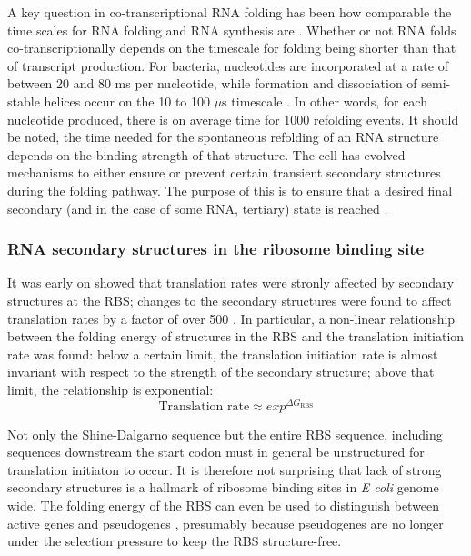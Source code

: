 A key question in co-transcriptional RNA folding has been how comparable the
time scales for RNA folding and RNA synthesis are
\cite{de_smit_translational_2003-1}. Whether or not RNA folds
co-transcriptionally depends on the timescale for folding being shorter than
that of transcript production. For bacteria, nucleotides are incorporated at a
rate of between 20 and 80 ms per nucleotide, while formation and dissociation
of semi-stable helices occur on the 10 to 100 $\mu$s timescale
\cite{isambert_jerky_2009}. In other words, for each nucleotide produced, there
is on average time for 1000 refolding events. It should be noted, the time
needed for the spontaneous refolding of an RNA structure depends on the binding
strength of that structure. The cell has evolved mechanisms to either ensure or
prevent certain transient secondary structures during the folding pathway. The
purpose of this is to ensure that a desired final secondary (and in the case of
some RNA, tertiary) state is reached \cite{pan_rna_2006-1}.

\subsubsection{RNA secondary structures in the ribosome binding site}
It was early on showed that translation rates were stronly affected by
secondary structures at the RBS; changes to the secondary structures were found
to affect translation rates by a factor of over 500
\cite{de_smit_secondary_1990}. In particular, a non-linear relationship between
the folding energy of structures in the RBS and the translation initiation
rate was found: below a certain limit, the translation initiation rate is almost
invariant with respect to the strength of the secondary structure; above that
limit, the relationship is exponential:
\begin{equation*}
	\text{Translation rate} \approx exp^{\Delta G_{\text{RBS}}}
\end{equation*}

Not only the Shine-Dalgarno sequence but the entire RBS sequence, including
sequences downstream the start codon \cite{seo_quantitative_2009} must in
general be unstructured for translation initiaton to occur. It is therefore not
surprising that lack of strong secondary structures is a hallmark of ribosome
binding sites in \textit{E coli} \cite{gu_universal_2010} genome wide. The
folding energy of the RBS can even be used to distinguish between active genes
and pseudogenes \cite{keller_reduced_2012}, presumably because pseudogenes are
no longer under the selection pressure to keep the RBS structure-free.

